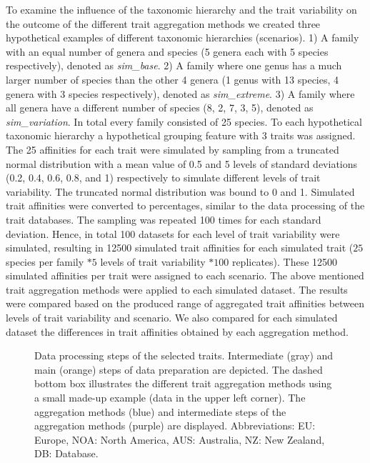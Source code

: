 \documentclass{article}
\begin{document}
To examine the influence of the taxonomic hierarchy and the trait variability on the outcome of the different trait aggregation methods we created three hypothetical examples of different taxonomic hierarchies (scenarios). 
1) A family with an equal number of genera and species (5 genera each with 5 species respectively), denoted as \textit{sim\_base}.
2) A family where one genus has a much larger number of species than the other 4 genera (1 genus with 13 species, 4 genera with 3 species respectively), denoted as \textit{sim\_extreme}. 
3) A family where all genera have a different number of species (8, 2, 7, 3, 5), denoted as \textit{sim\_variation}. In total every family consisted of 25 species. To each hypothetical taxonomic hierarchy a hypothetical grouping feature with 3 traits was assigned. The 25 affinities for each trait were simulated by sampling from a truncated normal distribution with a mean value of 0.5 and 5 levels of standard deviations (0.2, 0.4, 0.6, 0.8, and 1) respectively to simulate different levels of trait variability. The truncated normal distribution was bound to 0 and 1. Simulated trait affinities were converted to percentages, similar to the data processing of the trait databases. The sampling was repeated 100 times for each standard deviation. Hence, in total 100 datasets for each level of trait variability were simulated, resulting in 12500 simulated trait affinities for each simulated trait ($25$ species per family $* 5$ levels of trait variability $* 100$ replicates). These 12500 simulated affinities per trait were assigned to each scenario. The above mentioned trait aggregation methods were applied to each simulated dataset. 
The results were compared based on the produced range of aggregated trait affinities between levels of trait variability and scenario. We also compared for each simulated dataset the differences in trait affinities obtained by each aggregation method.  

\begin{figure}
  \centering
  
  \caption{Data processing steps of the selected traits. Intermediate (gray) and main (orange) steps of data preparation are depicted. The dashed bottom box illustrates the different trait aggregation methods using a small made-up example (data in the upper left corner). The aggregation methods (blue) and intermediate steps of the aggregation methods (purple) are displayed. Abbreviations: EU: Europe, NOA: North America, AUS: Australia, NZ: New Zealand, DB: Database.}
  \label{fig:data_proc_overview}
\end{figure}
\end{document}
